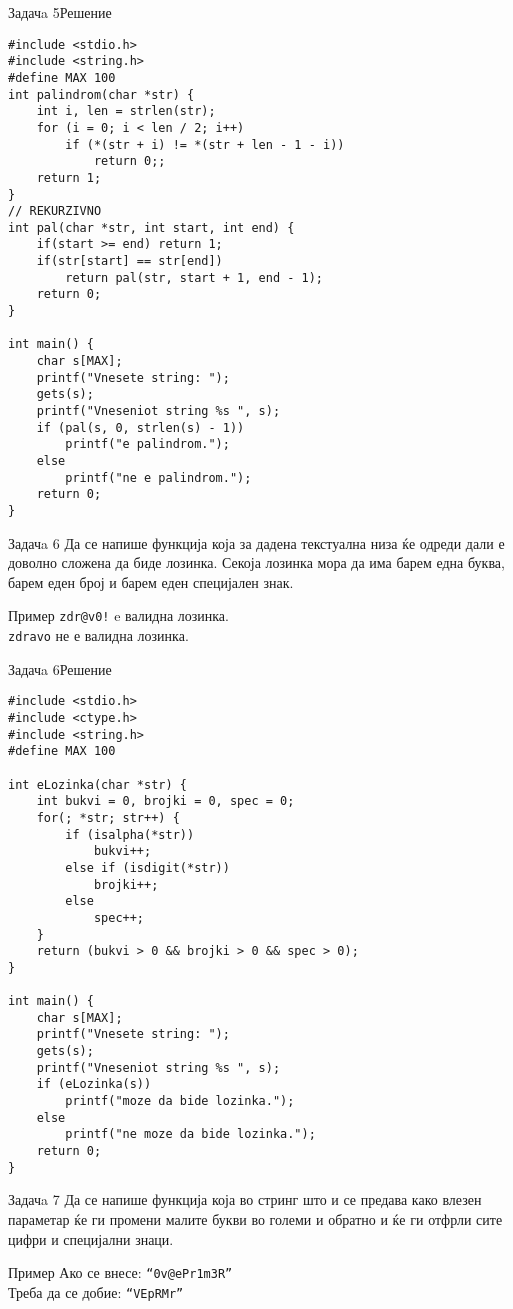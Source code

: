 \begin{frame}[fragile]{Задачa 5}{Решение}
\begin{lstlisting}
#include <stdio.h>
#include <string.h>
#define MAX 100
int palindrom(char *str) {
    int i, len = strlen(str);
    for (i = 0; i < len / 2; i++)
        if (*(str + i) != *(str + len - 1 - i))
            return 0;;
    return 1;
}
// REKURZIVNO
int pal(char *str, int start, int end) {
    if(start >= end) return 1;
    if(str[start] == str[end])
        return pal(str, start + 1, end - 1);
    return 0;
}

int main() {
    char s[MAX];
    printf("Vnesete string: ");
    gets(s);
    printf("Vneseniot string %s ", s);
    if (pal(s, 0, strlen(s) - 1))
        printf("e palindrom.");
    else
        printf("ne e palindrom.");
    return 0;
}
\end{lstlisting}
\end{frame}

\begin{frame}{Задачa 6}
Да се напише функција која за дадена текстуална низа ќе одреди дали е  доволно
сложена да биде лозинка. Секоја лозинка мора да има барем една буква, барем еден
број и барем еден специјален знак.
\begin{exampleblock}{Пример}
\texttt{zdr@v0!} e валидна лозинка.\\
\texttt{zdravo} не е валидна лозинка.
\end{exampleblock}
\end{frame}

\begin{frame}[fragile]{Задачa 6}{Решение}
\begin{lstlisting}
#include <stdio.h>
#include <ctype.h>
#include <string.h>
#define MAX 100

int eLozinka(char *str) {
    int bukvi = 0, brojki = 0, spec = 0;
    for(; *str; str++) {
        if (isalpha(*str))
            bukvi++;
        else if (isdigit(*str))
            brojki++;
        else
            spec++;
    }
    return (bukvi > 0 && brojki > 0 && spec > 0);
}

int main() {
    char s[MAX];
    printf("Vnesete string: ");
    gets(s);
    printf("Vneseniot string %s ", s);
    if (eLozinka(s))
        printf("moze da bide lozinka.");
    else
        printf("ne moze da bide lozinka.");
    return 0;
}
\end{lstlisting}
\end{frame}

\begin{frame}{Задачa 7}
Да се напише функција која во стринг што и се предава како влезен параметар ќе
ги промени малите букви во големи и обратно и ќе ги отфрли сите цифри и
специјални знаци.
    
\begin{exampleblock}{Пример}
Ако се внесе: \texttt{``0v@ePr1m3R''} \\
Треба да се добие: \texttt{``VEpRMr''} 
\end{exampleblock}
\end{frame}

